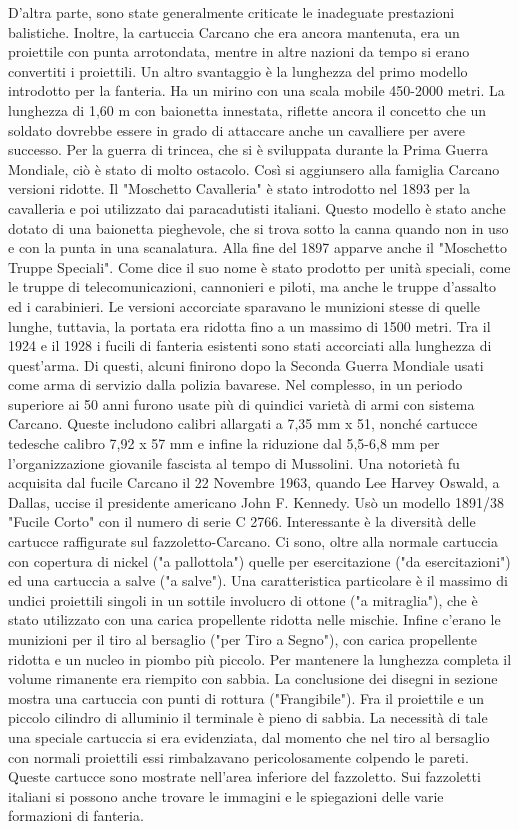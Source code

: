 D'altra parte, sono state generalmente criticate le inadeguate prestazioni balistiche. Inoltre, la cartuccia Carcano che era ancora mantenuta, era un proiettile con punta arrotondata, mentre in altre nazioni da tempo si erano convertiti i proiettili. 
   Un altro svantaggio è la lunghezza del primo modello introdotto per la fanteria. Ha un mirino con una scala mobile 450-2000 metri. La lunghezza di 1,60 m con baionetta innestata, riflette ancora il concetto che un soldato dovrebbe essere in grado di attaccare anche un cavalliere per avere successo. Per la guerra di trincea, che si è sviluppata durante la Prima Guerra Mondiale, ciò è stato di molto ostacolo.
   Così si aggiunsero alla famiglia Carcano versioni ridotte. Il "Moschetto Cavalleria" è stato introdotto nel 1893 per la cavalleria e poi utilizzato dai paracadutisti italiani. Questo modello è stato anche dotato di una baionetta pieghevole, che si trova sotto la canna quando non in uso e con la punta in una scanalatura. Alla fine del 1897 apparve anche il "Moschetto Truppe Speciali". Come dice il suo nome è stato prodotto per unità speciali, come le truppe di telecomunicazioni, cannonieri e piloti, ma anche le truppe d'assalto ed i carabinieri. Le versioni accorciate sparavano le munizioni stesse di quelle lunghe, tuttavia, la portata era ridotta fino a un massimo di 1500 metri. Tra il 1924 e il 1928 i fucili di fanteria esistenti sono stati accorciati alla lunghezza di quest'arma. Di questi, alcuni finirono dopo la Seconda Guerra Mondiale usati come arma di servizio dalla polizia bavarese.
   Nel complesso, in un periodo superiore ai 50 anni furono usate più di quindici varietà di armi con sistema Carcano. Queste includono calibri allargati a 7,35 mm x 51, nonché cartucce tedesche calibro 7,92 x 57 mm e infine la riduzione dal 5,5-6,8 mm per l'organizzazione giovanile fascista al tempo di Mussolini.
   Una notorietà fu acquisita dal fucile Carcano il 22 Novembre 1963, quando Lee Harvey Oswald, a Dallas, uccise il presidente americano John F. Kennedy. Usò un modello 1891/38 "Fucile Corto" con il numero di serie C 2766.
   Interessante è la diversità delle cartucce raffigurate sul fazzoletto-Carcano. Ci sono, oltre alla normale cartuccia con copertura di nickel ("a pallottola") quelle per esercitazione ("da esercitazioni") ed una cartuccia a salve ("a salve"). Una caratteristica particolare è il massimo di undici proiettili singoli in un sottile involucro di ottone ("a mitraglia"), che è stato utilizzato con una carica propellente ridotta nelle mischie. Infine c'erano le munizioni per il tiro al bersaglio ("per Tiro a Segno"), con carica propellente ridotta e un nucleo in piombo più piccolo. Per mantenere la lunghezza completa il volume rimanente era riempito con sabbia. La conclusione dei disegni in sezione mostra una cartuccia con punti di rottura ("Frangibile"). Fra il proiettile e un piccolo cilindro di alluminio il terminale è pieno di sabbia. La necessità di tale una speciale cartuccia si era evidenziata, dal momento che nel tiro al bersaglio con normali proiettili essi rimbalzavano pericolosamente colpendo le pareti. Queste cartucce sono mostrate nell'area inferiore del fazzoletto.
Sui fazzoletti italiani si possono anche trovare le immagini e le spiegazioni delle varie formazioni di fanteria.

